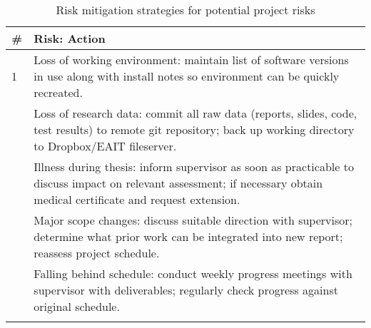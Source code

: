 \documentclass[pdftex,12pt,a4paper]{article}
\begin{document}
\begin{table}[H]
	\begin{center}
		\begin{tabularx}{\textwidth}{p{}X}
			\toprule
			\# & Risk: Action \\
			\midrule
			1 & Loss of working environment:
			maintain list of software versions in use along with install notes so environment can be quickly recreated. \\
			\addlinespace
			2 & Loss of research data:
			commit all raw data (reports, slides, code, test results) to remote git repository; back up working directory to Dropbox/EAIT fileserver. \\
			\addlinespace
			3 & Illness during thesis:
			inform supervisor as soon as practicable to discuss impact on relevant assessment; if necessary obtain medical certificate and request extension. \\
			\addlinespace
			4 & Major scope changes:
			discuss suitable direction with supervisor; determine what prior work can be integrated into new report; reassess project schedule. \\
			\addlinespace
			5 & Falling behind schedule:
			conduct weekly progress meetings with supervisor with deliverables; regularly check progress against original schedule. \\
			\addlinespace
			\bottomrule
		\end{tabularx}
		\caption{Risk mitigation strategies for potential project risks}
		\label{table:mitigation}
	\end{center}
\end{table}

\newpage 
{}


\end{document}
